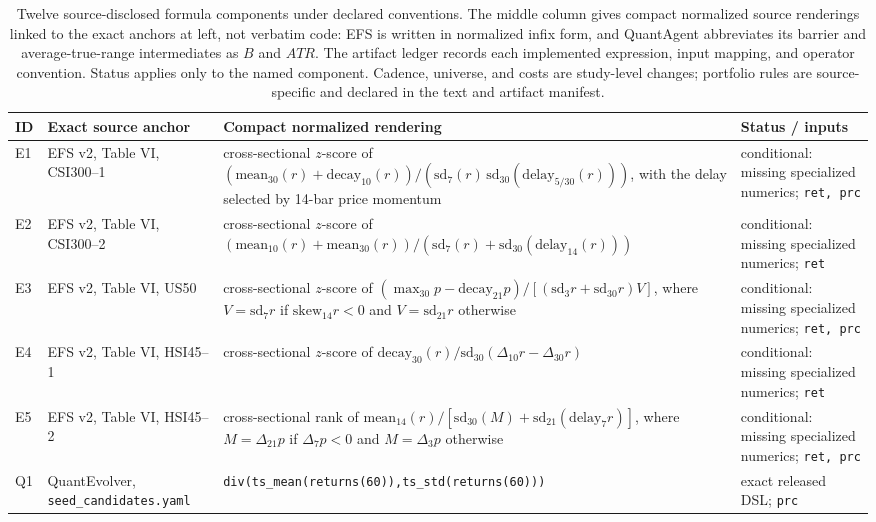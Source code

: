 \begin{table}[t]
\centering
\caption{Twelve source-disclosed formula components under declared conventions. The middle column gives compact normalized source renderings linked to the exact anchors at left, not verbatim code: EFS is written in normalized infix form, and QuantAgent abbreviates its barrier and average-true-range intermediates as $B$ and $ATR$. The artifact ledger records each implemented expression, input mapping, and operator convention. Status applies only to the named component. Cadence, universe, and costs are study-level changes; portfolio rules are source-specific and declared in the text and artifact manifest.}
\label{tab:disclosed-formulas}
\scriptsize
\setlength{\tabcolsep}{3.5pt}
\begin{tabular}{@{}p{}p{}p{}p{}@{}}
\toprule
\textbf{ID} & \textbf{Exact source anchor} & \textbf{Compact normalized rendering} & \textbf{Status / inputs} \\
\midrule
E1 & EFS v2, Table VI, CSI300--1 & cross-sectional $z$-score of $(\mathrm{mean}_{30}(r)+\mathrm{decay}_{10}(r))/(\mathrm{sd}_{7}(r)\,\mathrm{sd}_{30}(\mathrm{delay}_{5/30}(r)))$, with the delay selected by 14-bar price momentum & conditional: missing specialized numerics; \texttt{ret, prc} \\
E2 & EFS v2, Table VI, CSI300--2 & cross-sectional $z$-score of $(\mathrm{mean}_{10}(r)+\mathrm{mean}_{30}(r))/(\mathrm{sd}_{7}(r)+\mathrm{sd}_{30}(\mathrm{delay}_{14}(r)))$ & conditional: missing specialized numerics; \texttt{ret} \\
E3 & EFS v2, Table VI, US50 & cross-sectional $z$-score of $(\max_{30}p-\mathrm{decay}_{21}p)/[(\mathrm{sd}_{3}r+\mathrm{sd}_{30}r)V]$, where $V=\mathrm{sd}_{7}r$ if $\mathrm{skew}_{14}r<0$ and $V=\mathrm{sd}_{21}r$ otherwise & conditional: missing specialized numerics; \texttt{ret, prc} \\
E4 & EFS v2, Table VI, HSI45--1 & cross-sectional $z$-score of $\mathrm{decay}_{30}(r)/\mathrm{sd}_{30}(\Delta_{10}r-\Delta_{30}r)$ & conditional: missing specialized numerics; \texttt{ret} \\
E5 & EFS v2, Table VI, HSI45--2 & cross-sectional rank of $\mathrm{mean}_{14}(r)/[\mathrm{sd}_{30}(M)+\mathrm{sd}_{21}(\mathrm{delay}_{7}r)]$, where $M=\Delta_{21}p$ if $\Delta_{7}p<0$ and $M=\Delta_{3}p$ otherwise & conditional: missing specialized numerics; \texttt{ret, prc} \\
Q1 & QuantEvolver, \texttt{seed\_candidates.yaml} & \texttt{div(ts\_mean(returns(60)),ts\_std(returns(60)))} & exact released DSL; \texttt{prc} \\

\end{tabular}
\end{table}
